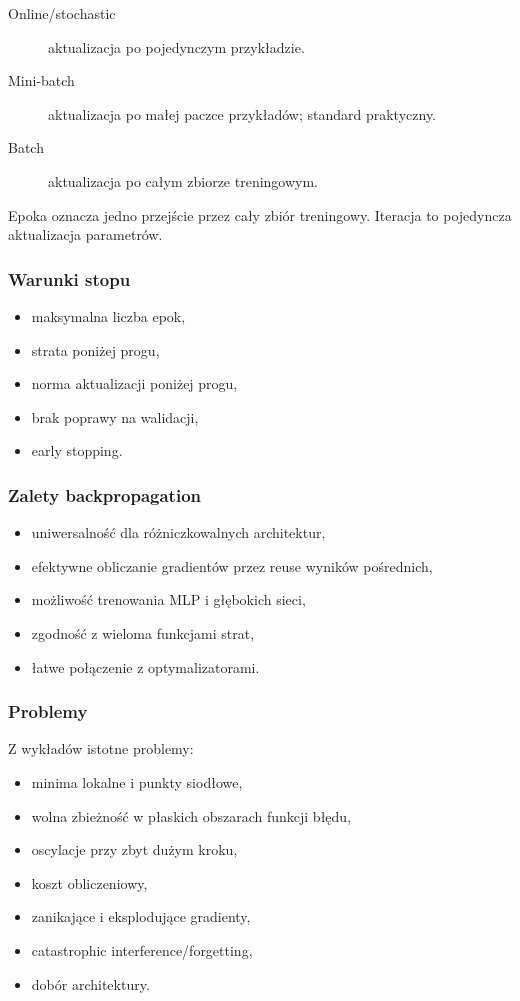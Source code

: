 \begin{description}
  \item[Online/stochastic] aktualizacja po pojedynczym przykładzie.
  \item[Mini-batch] aktualizacja po małej paczce przykładów; standard praktyczny.
  \item[Batch] aktualizacja po całym zbiorze treningowym.
\end{description}

Epoka oznacza jedno przejście przez cały zbiór treningowy. Iteracja to pojedyncza aktualizacja parametrów.

\subsubsection{Warunki stopu}

\begin{itemize}
  \item maksymalna liczba epok,
  \item strata poniżej progu,
  \item norma aktualizacji poniżej progu,
  \item brak poprawy na walidacji,
  \item early stopping.
\end{itemize}

\subsubsection{Zalety backpropagation}

\begin{itemize}
  \item uniwersalność dla różniczkowalnych architektur,
  \item efektywne obliczanie gradientów przez reuse wyników pośrednich,
  \item możliwość trenowania MLP i głębokich sieci,
  \item zgodność z wieloma funkcjami strat,
  \item łatwe połączenie z optymalizatorami.
\end{itemize}

\subsubsection{Problemy}

Z wykładów istotne problemy:
\begin{itemize}
  \item minima lokalne i punkty siodłowe,
  \item wolna zbieżność w płaskich obszarach funkcji błędu,
  \item oscylacje przy zbyt dużym kroku,
  \item koszt obliczeniowy,
  \item zanikające i eksplodujące gradienty,
  \item catastrophic interference/forgetting,
  \item dobór architektury.
\end{itemize}

